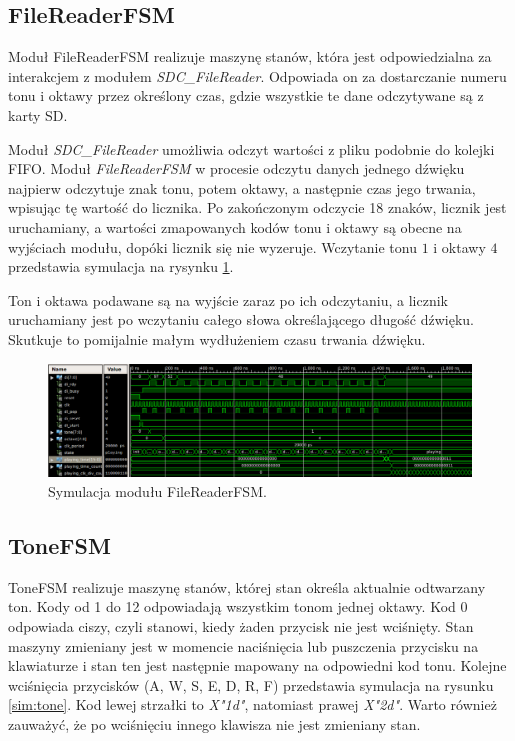 \documentclass[12pt]{article}
\begin{document}
\subsection{FileReaderFSM}

Moduł FileReaderFSM realizuje maszynę stanów, która jest odpowiedzialna za interakcjem z modułem \textit{SDC\_FileReader}. Odpowiada on za dostarczanie numeru tonu i oktawy przez określony czas, gdzie wszystkie te dane odczytywane są z karty SD.

Moduł \textit{SDC\_FileReader} umożliwia odczyt wartości z pliku podobnie do kolejki FIFO. Moduł \textit{FileReaderFSM} w procesie odczytu danych jednego dźwięku najpierw odczytuje znak tonu, potem oktawy, a następnie czas jego trwania, wpisując tę wartość do licznika. Po zakończonym odczycie 18 znaków, licznik jest uruchamiany, a wartości zmapowanych kodów tonu i oktawy są obecne na wyjściach modułu, dopóki licznik się nie wyzeruje. Wczytanie tonu $1$ i oktawy $4$ przedstawia symulacja na rysynku \ref{sim:fileReader}.

Ton i oktawa podawane są na wyjście zaraz po ich odczytaniu, a licznik uruchamiany jest po wczytaniu całego słowa określającego długość dźwięku. Skutkuje to pomijalnie małym wydłużeniem czasu trwania dźwięku.

\begin{figure}[H]
  \centering
  \includegraphics[decodearray={1 0 1 0 1 0}, width=\linewidth]{images/filereader}
  \caption{Symulacja modułu FileReaderFSM.}
  \label{sim:fileReader}
\end{figure}

\subsection{ToneFSM}
ToneFSM realizuje maszynę stanów, której stan określa aktualnie odtwarzany ton.
Kody od 1 do 12 odpowiadają wszystkim tonom jednej oktawy. Kod 0 odpowiada ciszy, czyli stanowi, kiedy żaden przycisk nie jest wciśnięty. Stan maszyny zmieniany jest w momencie naciśnięcia lub puszczenia przycisku na klawiaturze i stan ten jest następnie mapowany na odpowiedni kod tonu. Kolejne wciśnięcia przycisków (A, W, S, E, D, R, F) przedstawia symulacja na rysunku \ref{sim:tone}. Kod lewej strzałki to \textit{X"1d"}, natomiast prawej \textit{X"2d"}. Warto również zauważyć, że po wciśnięciu innego klawisza nie jest zmieniany stan.
\end{document}

